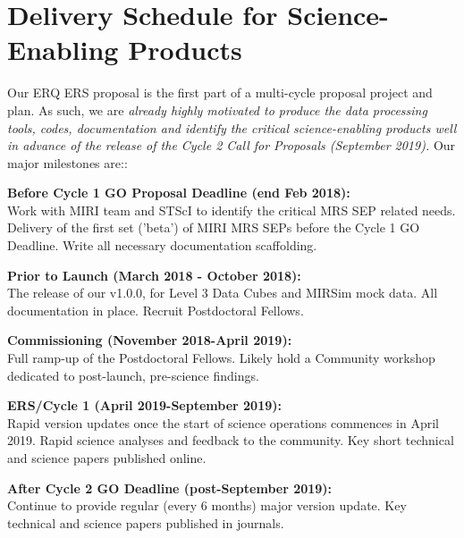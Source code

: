 \section*{Delivery Schedule for Science-Enabling Products} 
\vspace{-6pt}
Our ERQ ERS proposal is the first part of a multi-cycle proposal
project and plan.  As such, we are {\it already highly motivated to
produce the data processing tools, codes, documentation and identify
the critical science-enabling products well in advance of the release
of the Cycle 2 Call for Proposals (September 2019).}
Our major milestones are::

\smallskip
\smallskip
\noindent
{\bf Before Cycle 1 GO Proposal Deadline (end Feb 2018):}\\ 
Work with MIRI team and STScI to identify the critical MRS SEP related needs. 
Delivery of the first set ('beta') of MIRI MRS SEPs before the Cycle 1 GO Deadline. 
Write all necessary documentation scaffolding. 

\smallskip
\smallskip
\noindent
 {\bf Prior to Launch (March 2018 - October 2018):}\\ 
The release of our v1.0.0, for Level 3 Data Cubes and MIRSim mock data. 
All documentation in place. Recruit Postdoctoral Fellows. 

\smallskip
\smallskip
\noindent
{\bf Commissioning (November 2018-April 2019):}\\ 
Full ramp-up of the Postdoctoral Fellows. 
Likely hold a Community workshop dedicated to post-launch, 
pre-science findings. 

\smallskip
\smallskip
\noindent
{\bf ERS/Cycle 1 (April 2019-September 2019):}\\ 
Rapid version updates once the start of science operations commences in April 2019.  
Rapid science analyses and feedback to the community. 
Key short technical and science papers published online. 

\smallskip
\smallskip
\noindent
{\bf After Cycle 2 GO Deadline (post-September 2019):}\\ 
Continue to provide regular (every 6 months) major version update.
Key technical and science papers published in journals. 
